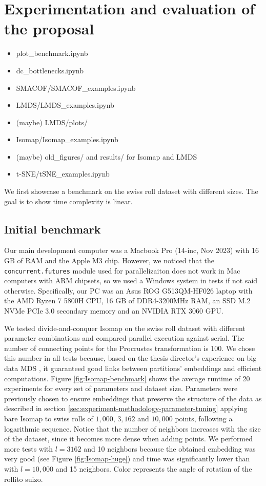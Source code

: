 \section{Experimentation and evaluation of the proposal}
\label{sec:experimentation-and-evaluation}

\begin{itemize}
    \item plot\_benchmark.ipynb
    \item dc\_bottlenecks.ipynb
    \item SMACOF/SMACOF\_examples.ipynb
    \item LMDS/LMDS\_examples.ipynb
    \item (maybe) LMDS/plots/
    \item Isomap/Isomap\_examples.ipynb
    \item (maybe) old\_figures/ and results/ for Isomap and LMDS
    \item t-SNE/tSNE\_examples.ipynb
\end{itemize}

We first showcase a benchmark on the swiss roll dataset with different sizes. The goal is to show time complexity is linear.

\subsection{Initial benchmark}

Our main development computer was a  Macbook Pro (14-inc, Nov 2023) with
16 GB of RAM and the Apple M3 chip. However, we noticed that the \verb|concurrent.futures| module used for parallelizaiton does not work in Mac computers with ARM chipsets, so we used a Windows system in tests if not said otherwise. Specifically, our PC was an Asus ROG G513QM-HF026 laptop with the AMD Ryzen 7 5800H CPU, 16 GB of DDR4-3200MHz RAM, an SSD M.2 NVMe PCIe 3.0 secondary memory and an NVIDIA RTX 3060 GPU.

We tested divide-and-conquer Isomap on the swiss roll dataset with different parameter combinations and compared parallel execution against serial. The number of connecting points for the Procrustes transformation is 100. We chose this number in all tests because, based on the thesis director's experience on big data MDS \citep{Delicado2024}, it guaranteed good links between partitions' embeddings and efficient computations. Figure \ref{fig:Isomap-benchmark} shows the average runtime of 20 experiments for every set of parameters and dataset size. Parameters were previously chosen to ensure embeddings that preserve the structure of the data as described in section \ref{sec:experiment-methodology-parameter-tuning} applying bare Isomap to swiss rolls of $1,000$, $3,162$ and $10,000$ points, following a logarithmic sequence. Notice that the number of neighbors increases with the size of the dataset, since it becomes more dense when adding points. We performed more tests with $l=3162$ and 10 neighbors because the obtained embedding was very good (see Figure \ref{fig:Isomap-huge}) and time was significantly lower than with $l=10,000$ and 15 neighbors. Color represents the angle of rotation of the rollito suizo.


